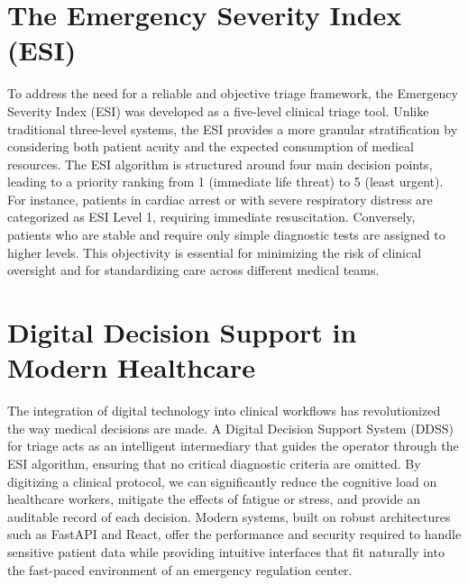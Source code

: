 \section{The Emergency Severity Index (ESI)}
To address the need for a reliable and objective triage framework, the Emergency Severity Index (ESI) was developed as a five-level clinical triage tool. Unlike traditional three-level systems, the ESI provides a more granular stratification by considering both patient acuity and the expected consumption of medical resources. The ESI algorithm is structured around four main decision points, leading to a priority ranking from 1 (immediate life threat) to 5 (least urgent). For instance, patients in cardiac arrest or with severe respiratory distress are categorized as ESI Level 1, requiring immediate resuscitation. Conversely, patients who are stable and require only simple diagnostic tests are assigned to higher levels. This objectivity is essential for minimizing the risk of clinical oversight and for standardizing care across different medical teams.

\section{Digital Decision Support in Modern Healthcare}
The integration of digital technology into clinical workflows has revolutionized the way medical decisions are made. A Digital Decision Support System (DDSS) for triage acts as an intelligent intermediary that guides the operator through the ESI algorithm, ensuring that no critical diagnostic criteria are omitted. By digitizing a clinical protocol, we can significantly reduce the cognitive load on healthcare workers, mitigate the effects of fatigue or stress, and provide an auditable record of each decision. Modern systems, built on robust architectures such as FastAPI and React, offer the performance and security required to handle sensitive patient data while providing intuitive interfaces that fit naturally into the fast-paced environment of an emergency regulation center.

\clearpage
